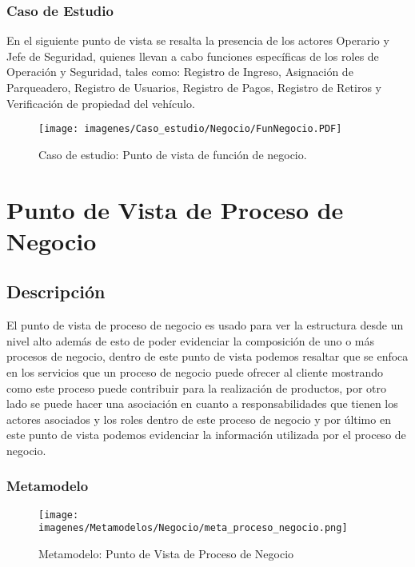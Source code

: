 \subsubsection{Caso de Estudio}
En el siguiente punto de vista se resalta la presencia de los actores Operario y Jefe de Seguridad, quienes llevan a cabo funciones específicas de los roles de Operación y Seguridad, tales como: Registro de Ingreso, Asignación de Parqueadero, Registro de Usuarios, Registro de Pagos, Registro de Retiros y Verificación de propiedad del vehículo.

\begin{figure}[h]
	\centering
	\texttt{[image: imagenes/Caso\_estudio/Negocio/FunNegocio.PDF]}
	\caption{Caso de estudio: Punto de vista de función de negocio.}
	\label{fig:gap_analysis}
\end{figure}








\section{Punto de Vista de Proceso de Negocio}
\subsection{Descripción}
El punto de vista de proceso de negocio es usado para ver la estructura desde un nivel alto además de esto de poder evidenciar la composición de uno o más procesos de negocio, dentro de este punto de vista podemos resaltar que se enfoca en los servicios que un proceso de negocio puede ofrecer al cliente mostrando como este proceso puede contribuir para la realización de productos, por otro lado se puede hacer una asociación en cuanto a responsabilidades que tienen los actores asociados y los roles dentro de este proceso de negocio y por último en este punto de vista podemos evidenciar la información utilizada por el proceso de negocio.

\subsubsection{Metamodelo}
\begin{figure}[h]
	\centering
	\texttt{[image: imagenes/Metamodelos/Negocio/meta\_proceso\_negocio.png]}
	\caption{Metamodelo: Punto de Vista de Proceso de Negocio}
	\label{fig:gap_analysis}
\end{figure}


